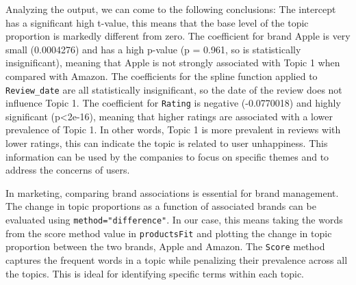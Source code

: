 Analyzing the output, we can come to the following conclusions: The
intercept has a significant high t-value, this means that the base level
of the topic proportion is markedly different from zero. The coefficient
for brand Apple is very small (0.0004276) and has a high p-value (p =
0.961, so is statistically insignificant), meaning that Apple is
not strongly associated with Topic 1 when compared with Amazon. The
coefficients for the spline function applied to \texttt{Review\_date}
are all statistically insignificant, so the date of the review does not
influence Topic 1. The coefficient for \texttt{Rating} is negative
(-0.0770018) and highly significant (p\textless2e-16), meaning that
higher ratings are associated with a lower prevalence of Topic 1. In other
words, Topic 1 is more prevalent in reviews with lower ratings, this can
indicate the topic is related to user unhappiness. This information can be
used by the companies to  focus on specific themes and to address
the concerns of users.

In marketing, comparing brand associations is essential for
brand management. The change in topic proportions as a function of
associated brands can be evaluated using \texttt{method="difference"}.
In our case, this means taking the words from the score method value in
\texttt{productsFit} and plotting the change in topic proportion between the
two brands, Apple and Amazon. The \texttt{Score} method captures the
frequent words in a topic while penalizing their prevalence across all the
topics. This is ideal for identifying specific terms within each topic.

\begin{Shaded}
\begin{Highlighting}[]
\OtherTok{\textless{}{-}} \SpecialCharTok{$}\NormalTok{, } \NormalTok{))}

 \NormalTok{, } \NormalTok{(}\NormalTok{, }\NormalTok{, }\NormalTok{, }\NormalTok{, }\NormalTok{),}
      \NormalTok{, } \NormalTok{,}
      \NormalTok{, } \NormalTok{,}
      \NormalTok{(}\SpecialCharTok{{-}}\NormalTok{, }\NormalTok{), } \NormalTok{, }
\end{Highlighting}
\end{Shaded}

